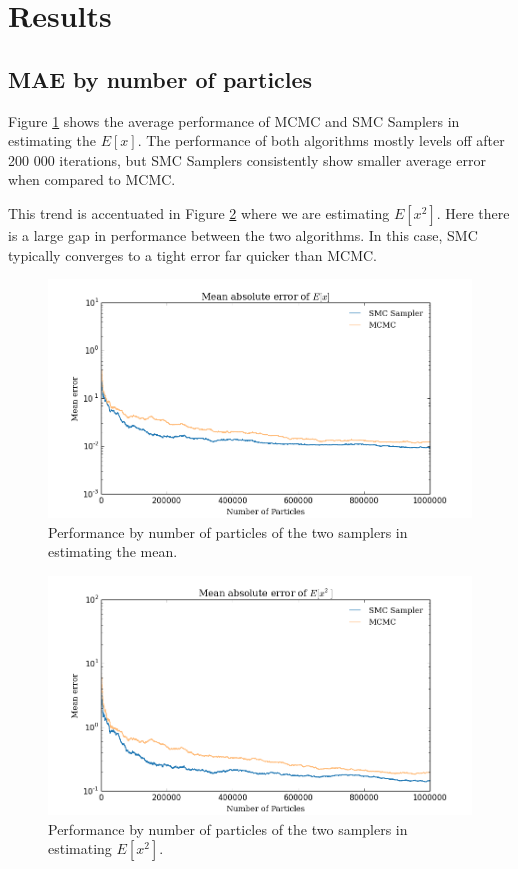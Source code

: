 \documentclass[12pt]{elsarticle}
\begin{document}
\section*{Results}

\subsection*{MAE by number of particles}
Figure \ref{ex} shows the average performance of MCMC and SMC Samplers in estimating the $E[x]$. The performance of both algorithms mostly levels off after 200 000 iterations, but SMC Samplers consistently show smaller average error when compared to MCMC. 

This trend is accentuated in Figure \ref{ex2} where we are estimating $E[x^2]$. Here there is a large gap in performance between the two algorithms. In this case, SMC typically converges to a tight error far quicker than MCMC.


\begin{figure}[htbp]
\begin{center}
\includegraphics[width = \textwidth]{plots/E_X.png}
\caption{Performance by number of particles of the two samplers in estimating the mean.}
\label{ex}
\end{center}
\end{figure}

\begin{figure}[htbp]
\begin{center}
\includegraphics[width = \textwidth]{plots/E_X2.png}
\caption{Performance by number of particles of the two samplers in estimating $E[x^2]$.}
\label{ex2}
\end{center}
\end{figure}
\end{document}
